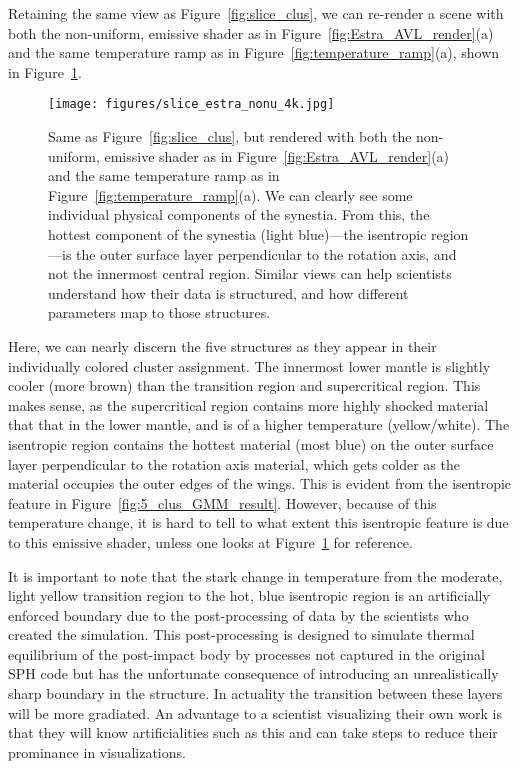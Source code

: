 \documentclass[fleqn,usenatbib,useAMS]{mnras}
\begin{document}
Retaining the same view as Figure~\ref{fig:slice_clus}, we can re-render a scene with both the non-uniform, emissive shader as in Figure~\ref{fig:Estra_AVL_render}(a) and the same temperature ramp as in Figure~\ref{fig:temperature_ramp}(a), shown in Figure~\ref{fig:slice_color}. 
%
\begin{figure}
\centering
\texttt{[image: figures/slice\_estra\_nonu\_4k.jpg]}
\caption{Same as Figure~\ref{fig:slice_clus}, but rendered with both the non-uniform, emissive shader as in Figure~\ref{fig:Estra_AVL_render}(a) and the same temperature ramp as in Figure~\ref{fig:temperature_ramp}(a). We can clearly see some individual physical components of the synestia. From this, the hottest component of the synestia (light blue)---the isentropic region---is the outer surface layer perpendicular to the rotation axis, and not the innermost central region. Similar views can help scientists understand how their data is structured, and how different parameters map to those structures.}
\label{fig:slice_color}
\end{figure}
%
Here, we can nearly discern the five structures as they appear in their individually colored cluster assignment. The innermost lower mantle is slightly cooler (more brown) than the transition region and supercritical region. This makes sense, as the supercritical region contains more highly shocked material that that in the lower mantle, and is of a higher temperature (yellow/white). The isentropic region contains the hottest material (most blue) on the outer surface layer perpendicular to the rotation axis material, which gets colder as the material occupies the outer edges of the wings. This is evident from the isentropic feature in Figure~\ref{fig:5_clus_GMM_result}. However, because of this temperature change, it is hard to tell to what extent this isentropic feature is due to this emissive shader, unless one looks at Figure~\ref{fig:slice_color} for reference. \par 

It is important to note that the stark change in temperature from the moderate, light yellow transition region to the hot, blue isentropic region is an artificially enforced boundary due to the post-processing of data by the scientists who created the simulation. This post-processing is designed to simulate thermal equilibrium of the post-impact body by processes not captured in the original SPH code but has the unfortunate consequence of introducing an unrealistically sharp boundary in the structure. In actuality the transition between these layers will be more gradiated. An advantage to a scientist visualizing their own work is that they will know artificialities such as this and can take steps to reduce their prominance in visualizations. \par 
\end{document}
